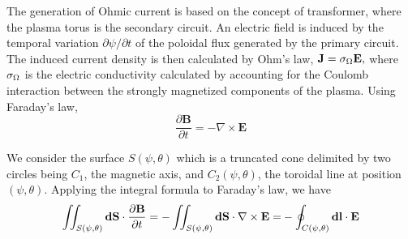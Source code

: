 
\label{Efield}The generation of Ohmic current is based on the
concept of transformer, where the plasma torus is the secondary
circuit. An electric field is induced by the temporal variation
$\partial \psi /\partial t$ of the poloidal flux generated by the
primary circuit. The induced current density
is then calculated by Ohm's law, $\mathbf{J}=\Bbb{\sigma }_{\Omega }\mathbf{E%
},$ where $\Bbb{\sigma }_{\Omega }$ is the electric conductivity calculated
by accounting for the Coulomb interaction between the strongly magnetized
components of the plasma. Using Faraday's law,
\[
\frac{\partial \mathbf{B}}{\partial t}=-\nabla \times \mathbf{E}
\]

We consider the surface $S\left( \psi ,\theta \right) $ which is a truncated
cone delimited by two circles being $C_{1}$, the magnetic axis, and $%
C_{2}\left( \psi ,\theta \right) $, the toroidal line at position $\left(
\psi ,\theta \right) $. Applying the integral formula to Faraday's law, we
have
\begin{equation}
\iint_{S\left( \psi ,\theta \right) }\mathbf{dS}\cdot \frac{\partial \mathbf{%
B}}{\partial t}=-\iint_{S\left( \psi ,\theta \right) }\mathbf{dS}\cdot
\nabla \times \mathbf{E=}-\oint_{C\left( \psi ,\theta \right) }\mathbf{dl}%
\cdot \mathbf{E}
\end{equation}

